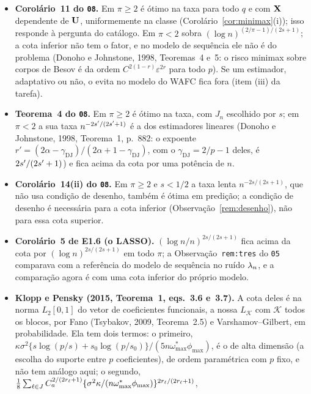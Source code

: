 \documentclass[11pt,a4paper]{article}
\newcommand{\Kcal}{\mathcal{K}}
\newcommand{\Lk}{L_{\mathcal{K}}}
\begin{document}
\begin{itemize}[leftmargin=*]
  \item \textbf{Corolário~11 do \texttt{08}.} Em $\pi \ge 2$ é ótimo na taxa
    para todo $q$ e com $\mathbf{X}$ dependente de $\mathbf{U}$, uniformemente na classe
    (Corolário~\ref{cor:minimax}(i)); isso responde à pergunta do catálogo.
    Em $\pi < 2$ sobra $(\log n)^{(2/\pi-1)/(2s+1)}$; a cota inferior não tem
    o fator, e no modelo de sequência ele não é do problema (Donoho e
    Johnstone, 1998, Teoremas~4 e~5: o risco minimax sobre corpos de Besov é
    da ordem $C^{2(1-r)}\varepsilon^{2r}$ para todo $p$). Se um estimador,
    adaptativo ou não, o evita no modelo do WAFC fica fora (item (iii) da
    tarefa).
  \item \textbf{Teorema~4 do \texttt{08}.} Em $\pi \ge 2$ é ótimo na taxa,
    com $J_{n}$ escolhido por $s$; em $\pi < 2$ a sua taxa
    $n^{-2s'/(2s'+1)}$ é a dos estimadores lineares (Donoho e Johnstone,
    1998, Teorema~1, p.~882: o expoente $r' = (2\alpha-\gamma_{\mathrm{DJ}})/(2\alpha + 1 -
    \gamma_{\mathrm{DJ}})$, com o $\gamma_{\mathrm{DJ}} = 2/p - 1$ deles, é $2s'/(2s'+1)$) e fica acima da
    cota por uma potência de $n$.
  \item \textbf{Corolário~14(ii) do \texttt{08}.} Em $\pi \ge 2$ e
    $s < 1/2$ a taxa lenta $n^{-2s/(2s+1)}$, que não usa condição de desenho,
    também é ótima em predição; a condição de desenho é necessária para a
    cota inferior (Observação~\ref{rem:desenho}), não para essa cota superior.
  \item \textbf{Corolário~5 de E1.6 (o LASSO).} $(\log n/n)^{2s/(2s+1)}$ fica
    acima da cota por $(\log n)^{2s/(2s+1)}$ em todo $\pi$; a
    Observação~\texttt{rem:tres} do \texttt{05} comparava com a referência do
    modelo de sequência no ruído $\lambda_{n}$, e a comparação agora é com uma
    cota inferior do próprio modelo.
  \item \textbf{Klopp e Pensky (2015, Teorema~1, eqs.~3.6 e~3.7).} A cota
    deles é na norma $L_{2}[0,1]$ do vetor de coeficientes funcionais, a nossa
    $\Lk$ com $\Kcal$ todos os blocos, por Fano (Tsybakov, 2009, Teorema~2.5)
    e Varshamov--Gilbert, em probabilidade. Ela tem dois termos: o primeiro,
    $\kappa\sigma^{2}\{s\log(p/s) + s_{0}\log(p/s_{0})\}/(5n\omega^{*}_{\max}
    \phi_{\max})$, é o de alta dimensão (a escolha do suporte entre $p$
    coeficientes), de ordem paramétrica com $p$ fixo, e não tem análogo aqui;
    o segundo, $\frac18\sum_{\ell\in J}C_{a}^{2/(2r_{\ell}+1)}
    \{\sigma^{2}\kappa/(n\omega^{*}_{\max}\phi_{\max})\}^{2r_{\ell}/(2r_{\ell}+1)}$,

\end{itemize}
\end{document}
